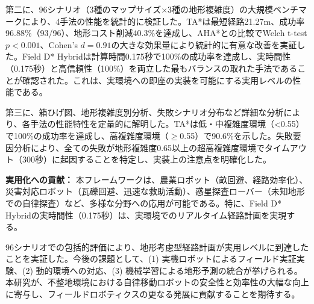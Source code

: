 第二に、96シナリオ（3種のマップサイズ$\times$3種の地形複雑度）の大規模ベンチマークにより、4手法の性能を統計的に検証した。TA*は最短経路21.27m、成功率96.88\%（93/96）、地形コスト削減40.3\%を達成し、AHA*との比較でWelch t-test $p<0.001$、Cohen's $d=0.91$の大きな効果量により統計的に有意な改善を実証した。Field D* Hybridは計算時間0.175秒で100\%の成功率を達成し、実時間性（0.175秒）と高信頼性（100\%）を両立した最もバランスの取れた手法であることが確認された。これは、実環境への即座の実装を可能にする実用レベルの性能である。

第三に、箱ひげ図、地形複雑度別分析、失敗シナリオ分布など詳細な分析により、各手法の性能特性を定量的に解明した。TA*は低・中複雑度環境（<0.55）で100\%の成功率を達成し、高複雑度環境（$\geq$0.55）で90.6\%を示した。失敗要因分析により、全ての失敗が地形複雑度0.65以上の超高複雑度環境でタイムアウト（300秒）に起因することを特定し、実装上の注意点を明確化した。

\textbf{実用化への貢献：}
本フレームワークは、農業ロボット（畝回避、経路効率化）、災害対応ロボット（瓦礫回避、迅速な救助活動）、惑星探査ローバー（未知地形での自律探査）など、多様な分野への応用が可能である。特に、Field D* Hybridの実時間性（0.175秒）は、実環境でのリアルタイム経路計画を実現する。

96シナリオでの包括的評価により、地形考慮型経路計画が実用レベルに到達したことを実証した。今後の課題として、(1) 実機ロボットによるフィールド実証実験、(2) 動的環境への対応、(3) 機械学習による地形予測の統合が挙げられる。本研究が、不整地環境における自律移動ロボットの安全性と効率性の大幅な向上に寄与し、フィールドロボティクスの更なる発展に貢献することを期待する。
